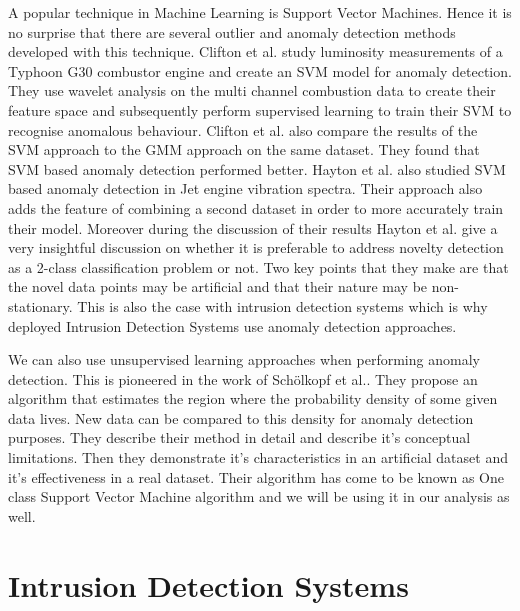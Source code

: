 \documentclass[reqno,openany,12pt]{amsbook}
\begin{document}
A popular technique in Machine Learning is Support Vector Machines. Hence it is no surprise that there are several outlier and anomaly detection methods developed with this technique. Clifton et al.\cite{out2} study luminosity measurements of a Typhoon G30 combustor engine and create an SVM model
for anomaly detection. They use wavelet analysis on the multi channel combustion data to create their feature space and subsequently perform supervised learning to train their SVM to recognise anomalous behaviour. Clifton et al. also compare the results of the SVM approach to the GMM approach on the same dataset. They found that SVM based anomaly detection performed better.
Hayton et al.\cite{out3} also studied SVM based anomaly detection in Jet engine vibration spectra. Their approach also adds the feature of combining a second dataset in order to more accurately train their model. Moreover during the discussion of their results Hayton et al. give a very insightful discussion
on whether it is preferable to address novelty detection as a 2-class classification problem or not. Two key points that they make are that the novel data points may be artificial and that their nature may be non-stationary. This is also the case with intrusion detection systems which is why deployed Intrusion Detection Systems use anomaly detection approaches. 



We can also use unsupervised learning approaches when performing anomaly detection. This is pioneered in the work of Schölkopf et al.\cite{out4}. They propose an algorithm that estimates the region where the probability density of some given data lives. New data can be compared to this density for anomaly detection purposes. They describe their method in detail and describe it's conceptual limitations. Then they demonstrate it's characteristics in an artificial dataset and it's effectiveness in a real dataset. Their algorithm has come to be known as One class Support Vector Machine algorithm and we will be using it in our analysis as well.

\section{Intrusion Detection Systems}
\end{document}

